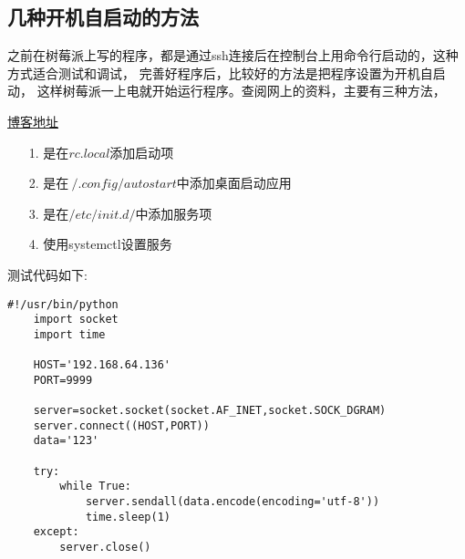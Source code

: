 \subsection{几种开机自启动的方法}
之前在树莓派上写的程序，都是通过ssh连接后在控制台上用命令行启动的，这种方式适合测试和调试，
完善好程序后，比较好的方法是把程序设置为开机自启动，
这样树莓派一上电就开始运行程序。查阅网上的资料，主要有三种方法，
\par \href{https://blog.csdn.net/wangzhenyang2/article/details/80215149?utm_medium=distribute.pc_relevant.none-task-blog-BlogCommendFromMachineLearnPai2-1.nonecase&depth_1-utm_source=distribute.pc_relevant.none-task-blog-BlogCommendFromMachineLearnPai2-1.nonecase}{博客地址}
\begin{itemize}
    \item [1.] 是在$rc.local$添加启动项
    \item [2.] 是在$~/.config/autostart$中添加桌面启动应用
    \item [3.] 是在$/etc/init.d/$中添加服务项
    \item [4.] 使用systemctl设置服务
\end{itemize}
测试代码如下:
\begin{lstlisting}[title=UDP测试代码]
    #!/usr/bin/python
    import socket
    import time
    
    HOST='192.168.64.136'
    PORT=9999
    
    server=socket.socket(socket.AF_INET,socket.SOCK_DGRAM)
    server.connect((HOST,PORT))
    data='123'
    
    try:
        while True:
            server.sendall(data.encode(encoding='utf-8'))
            time.sleep(1)
    except:
        server.close()
\end{lstlisting}